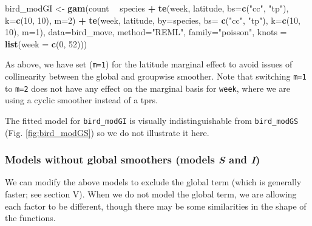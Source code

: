 \documentclass[12pt]{article}
\newenvironment{Shaded}{\begin{snugshade}}{\end{snugshade}}
\newcommand{\KeywordTok}[1]{\textcolor[rgb]{0.13,0.29,0.53}{\textbf{#1}}}
\newcommand{\DataTypeTok}[1]{\textcolor[rgb]{0.13,0.29,0.53}{#1}}
\newcommand{\DecValTok}[1]{\textcolor[rgb]{0.00,0.00,0.81}{#1}}
\newcommand{\StringTok}[1]{\textcolor[rgb]{0.31,0.60,0.02}{#1}}
\newcommand{\OperatorTok}[1]{\textcolor[rgb]{0.81,0.36,0.00}{\textbf{#1}}}
\newcommand{\NormalTok}[1]{#1}
\begin{document}
\begin{Shaded}
\begin{Highlighting}[]
\NormalTok{bird_modGI <-}\StringTok{ }\KeywordTok{gam}\NormalTok{(count }\OperatorTok{~}\StringTok{ }\NormalTok{species }\OperatorTok{+}
\StringTok{                   }\KeywordTok{te}\NormalTok{(week, latitude, }\DataTypeTok{bs=}\KeywordTok{c}\NormalTok{(}\StringTok{"cc"}\NormalTok{, }\StringTok{"tp"}\NormalTok{),}
                      \DataTypeTok{k=}\KeywordTok{c}\NormalTok{(}\DecValTok{10}\NormalTok{, }\DecValTok{10}\NormalTok{), }\DataTypeTok{m=}\DecValTok{2}\NormalTok{) }\OperatorTok{+}
\StringTok{                   }\KeywordTok{te}\NormalTok{(week, latitude, }\DataTypeTok{by=}\NormalTok{species, }\DataTypeTok{bs=} \KeywordTok{c}\NormalTok{(}\StringTok{"cc"}\NormalTok{, }\StringTok{"tp"}\NormalTok{),}
                      \DataTypeTok{k=}\KeywordTok{c}\NormalTok{(}\DecValTok{10}\NormalTok{, }\DecValTok{10}\NormalTok{), }\DataTypeTok{m=}\DecValTok{1}\NormalTok{),}
                 \DataTypeTok{data=}\NormalTok{bird_move, }\DataTypeTok{method=}\StringTok{"REML"}\NormalTok{, }\DataTypeTok{family=}\StringTok{"poisson"}\NormalTok{,}
                 \DataTypeTok{knots =} \KeywordTok{list}\NormalTok{(}\DataTypeTok{week =} \KeywordTok{c}\NormalTok{(}\DecValTok{0}\NormalTok{, }\DecValTok{52}\NormalTok{)))}
\end{Highlighting}
\end{Shaded}

As above, we have set (\texttt{m=1}) for the latitude marginal effect to
avoid issues of collinearity between the global and groupwise smoother.
Note that switching \texttt{m=1} to \texttt{m=2} does not have any
effect on the marginal basis for \texttt{week}, where we are using a
cyclic smoother instead of a tprs.

The fitted model for \texttt{bird\_modGI} is visually indistinguishable
from \texttt{bird\_modGS} (Fig. \ref{fig:bird_modGS}) so we do not
illustrate it here.

\subsubsection{\texorpdfstring{Models without global smoothers (models
\emph{S} and
\emph{I})}{Models without global smoothers (models S and I)}}\label{models-without-global-smoothers-models-s-and-i}

We can modify the above models to exclude the global term (which is
generally faster; see section V). When we do not model the global term,
we are allowing each factor to be different, though there may be some
similarities in the shape of the functions.
\end{document}
